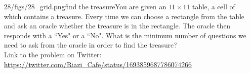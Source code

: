 \begin{problem}{28/figs/28_grid.png}{find the treasure}You are given an $11 \times 11$ table, a cell of which contains a treasure. Every time we can choose a  rectangle from the table and ask an oracle whether the treasure is in the rectangle. The oracle then responds with a ``Yes" or a ``No". What is the minimum number of questions we need to ask from the oracle in order to find the treasure?\\[0.2cm]

Link to the problem on Twitter:  \url{https://twitter.com/Riazi_Cafe/status/1693859687786074266}\end{problem}